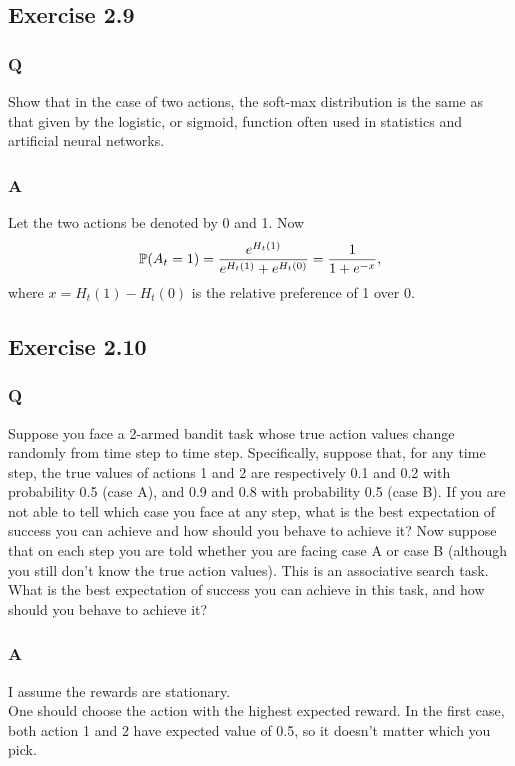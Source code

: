 \subsection{Exercise 2.9}
\subsubsection{Q}
Show that in the case of two actions, the soft-max distribution is the same as that given by the logistic, or sigmoid, function often used in statistics and artificial neural networks.

\subsubsection{A}
Let the two actions be denoted by 0 and 1. Now
\begin{equation}
    \P{}(A_t = 1) = \frac{e^{H_t(1)}}{e^{H_t(1)} + e^{H_t(0)}} = \frac{1}{1 + e^{-x}}, 
\end{equation}
where $x = H_t(1) - H_t(0)$ is the relative preference of 1 over 0.

\subsection{Exercise 2.10}
\subsubsection{Q}
Suppose you face a 2-armed bandit task whose true action values change randomly from time step to time step. Specifically, suppose that, for any time step, the true values of actions 1 and 2 are respectively 0.1 and 0.2 with probability 0.5 (case A), and 0.9 and 0.8 with probability 0.5 (case B). If you are not able to tell which case you face at any step, what is the best expectation of success you can achieve and how should you behave to achieve it? Now suppose that on each step you are told whether you are facing case A or case B (although you still don’t know the true action values). This is an associative search task. What is the best expectation of success you can achieve in this task, and how should you behave to achieve it?

\subsubsection{A}
I assume the rewards are stationary.\\

One should choose the action with the highest expected reward. In the first case, both action 1 and 2 have expected value of 0.5, so it doesn't matter which you pick.\\

